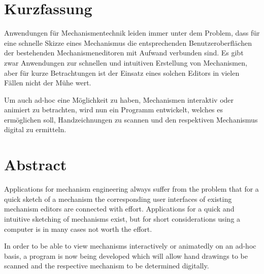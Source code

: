 \section*{Kurzfassung}
Anwendungen für Mechanismentechnik leiden immer unter dem Problem, dass für eine schnelle Skizze eines Mechanismus die entsprechenden Benutzeroberflächen der bestehenden Mechanismeneditoren mit Aufwand verbunden sind. Es gibt zwar Anwendungen zur schnellen und intuitiven Erstellung von Mechanismen, aber für kurze Betrachtungen ist der Einsatz eines solchen Editors in vielen Fällen nicht der Mühe wert.

Um auch ad-hoc eine Möglichkeit zu haben, Mechanismen interaktiv oder animiert zu betrachten, wird nun ein Programm entwickelt, welches es ermöglichen soll, Handzeichnungen zu scannen und den respektiven Mechanismus digital zu ermitteln.

\section*{Abstract}
Applications for mechanism engineering always suffer from the problem that for a quick sketch of a mechanism the corresponding user interfaces of existing mechanism editors are connected with effort.
Applications for a quick and intuitive sketching of mechanisms exist, but for short considerations using a computer is in many cases not worth the effort.

In order to be able to view mechanisms interactively or animatedly on an ad-hoc basis, a program is now being developed which will allow hand drawings to be scanned and the respective mechanism to be determined digitally.
